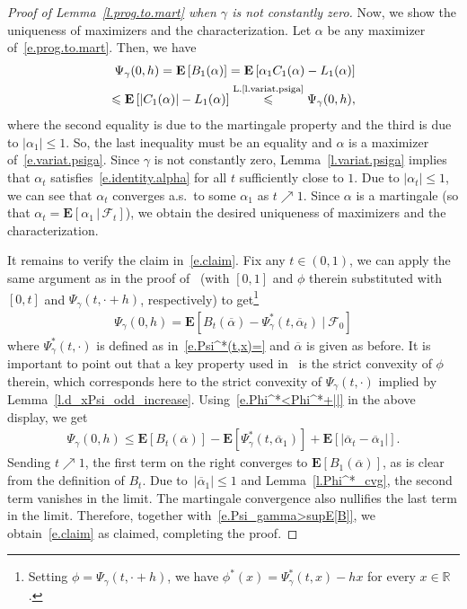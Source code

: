 \documentclass[11pt]{amsart}
\theoremstyle{remark}
\theoremstyle{definition}
\numberwithin{equation}{section}
\numberwithin{proposition}{section}
\numberwithin{figure}{section}
\numberwithin{table}{section}
\newcommand{\R}{\mathbb{R}}
\newcommand{\EE}{\mathbf{E}}
\renewcommand{\leq}{\leqslant}
\renewcommand{\bar}{\overline}
\newcommand{\Ll}{\left}
\newcommand{\Rr}{\right}
\newcommand{\1}{\mathbf{1}}
\newcommand{\mcl}{\mathcal}
\begin{document}
\begin{proof}[Proof of Lemma~\ref{l.prog.to.mart} when $\gamma$ is not constantly zero]
Now, we show the uniqueness of maximizers and the characterization. Let $\alpha$ be any maximizer of~\eqref{e.prog.to.mart}. Then, we have
\begin{align*}
    \Psi_\gamma(0,h) = \EE \Ll[B_1(\alpha)\Rr]= \EE \Ll[\alpha_1C_1(\alpha)-L_1(\alpha)\Rr]
    \\
    \leq \EE \Ll[|C_1(\alpha)|-L_1(\alpha)\Rr]\stackrel{\text{L.\ref{l.variat.psiga}}}{\leq}\Psi_\gamma(0,h),
\end{align*}
where the second equality is due to the martingale property and the third is due to $|\alpha_1|\leq 1$. So, the last inequality must be an equality and $\alpha$ is a maximizer of~\eqref{e.variat.psiga}. Since $\gamma$ is not constantly zero, Lemma~\ref{l.variat.psiga} implies that $\alpha_t$ satisfies~\eqref{e.identity.alpha} for all $t$ sufficiently close to $1$. 
Due to $|\alpha_t|\leq1$, we can see that $\alpha_t$ converges a.s.\ to some $\alpha_1$ as $t\nearrow1$.
Since $\alpha$ is a martingale (so that $\alpha_t =\EE [\alpha_1\,|\, \mcl F_t]$), we obtain the desired uniqueness of maximizers and the characterization.

It remains to verify the claim in~\eqref{e.claim}.
Fix any $t\in(0,1)$, we can apply the same argument as in the proof of~\cite[Lemma~2.2]{mourrat2025uninverting} (with $[0,1]$ and $\phi$ therein substituted with $[0,t]$ and $\Psi_\gamma(t,\cdot +h)$, respectively) to get\footnote{Setting $\phi = \Psi_\gamma(t,\cdot +h)$, we have $\phi^*(x) = \Psi_\gamma^*(t,x) -hx$ for every $x\in\R$.}
\begin{align*}
    \Psi_\gamma(0,h) = \EE \Ll[B_t(\bar\alpha) - \Psi_\gamma^*(t,\bar\alpha_t)\ \big|\ \mathcal{F}_0\Rr]
\end{align*}
where $\Psi_\gamma^*(t,\cdot)$ is defined as in~\eqref{e.Psi^*(t,x)=} and $\bar\alpha$ is given as before. 
It is important to point out that a key property used in~\cite[Lemma~2.2]{mourrat2025uninverting} is the strict convexity of $\phi$ therein, which corresponds here to the strict convexity of $\Psi_\gamma(t,\cdot)$ implied by Lemma~\ref{l.d_xPsi_odd_increase}.
Using~\eqref{e.Phi^*<Phi^*+||} in the above display, we get
\begin{align*}
    \Psi_\gamma(0,h) \leq \EE \Ll[B_t(\bar\alpha)\Rr] - \EE \Ll[\Psi_\gamma^*(t,\bar\alpha_1)\Rr]+ \EE \Ll[\Ll|\bar\alpha_t-\bar\alpha_1\Rr|\Rr].
\end{align*}
Sending $t\nearrow1$, the first term on the right converges to $\EE \Ll[B_1(\bar\alpha)\Rr]$, as is clear from the definition of $B_t$. Due to~$|\bar\alpha_1|\leq 1$ and Lemma~\ref{l.Phi^*_cvg}, the second term vanishes in the limit. The martingale convergence also nullifies the last term in the limit. Therefore, together with~\eqref{e.Psi_gamma>supE[B]}, we obtain~\eqref{e.claim} as claimed, completing the proof.
\end{proof}
\end{document}
